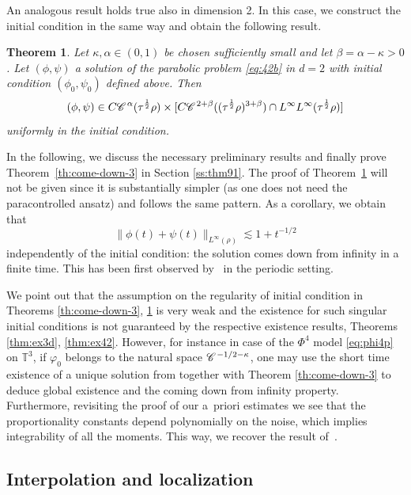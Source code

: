 \documentclass[a4paper,11pt]{article}
\newtheorem{theorem}{Theorem}[section]
\numberwithin{equation}{section}
\newcommand{\CC}{\mathscr{C} \hspace{.1em}}
\newcommand{\8}{\infty}
\begin{document}
An analogous result holds true also in dimension 2. In this case, we construct the initial condition in the same way and obtain the following result.


\begin{theorem}
  \label{th:come-down-2}
  Let $\kappa, \alpha\in (0,1)$ be chosen sufficiently small and let $\beta=\alpha-\kappa>0$. Let $(\phi, \psi)$ a solution of the parabolic problem \eqref{eq:42b}
  in $d = 2$ with initial condition $(\phi_{0},\psi_{0})$ defined above. Then
  \[ (\phi, \psi) \in C \CC^{\alpha} (\tau^{\frac 12} \rho) \times [C \CC^{2
     + \beta} ((\tau^{ \frac 12} \rho)^{3 + \beta}) \cap L^{\infty}
     L^{\infty} (\tau^{\frac 12} \rho)] \]
  uniformly in the initial condition.
\end{theorem}


In the following, we discuss the necessary preliminary results and finally prove Theorem~\ref{th:come-down-3} in Section \ref{ss:thm91}. The proof of
Theorem~\ref{th:come-down-2} will not be given since it is substantially simpler
(as one does not need the paracontrolled ansatz) and follows the same pattern.
As a corollary,  we obtain that
\[ \| \phi (t) + \psi (t) \|_{L^{\infty}(\rho)} \lesssim 1 + t^{- 1 / 2} \]
independently of the initial condition: the solution comes down from infinity in a
finite time. This has been first observed by~\cite{MWcomedown} in the periodic setting.




\begin{remark}
We point out that the assumption on the regularity of initial condition in Theorems \ref{th:come-down-3}, \ref{th:come-down-2} is very weak and the existence for such singular initial conditions is not guaranteed  by the respective existence results, Theorems \ref{thm:ex3d}, \ref{thm:ex42}. However, for instance in case of the $\Phi^{4}$ model  \eqref{eq:phi4p} on $\mathbb{T}^{3}$, if $\varphi_{0}$ belongs to the natural space $\CC^{-1/2-\kappa}$, one may use the short time existence of a unique solution from \cite{CC} together with Theorem \ref{th:come-down-3} to deduce global existence and the coming down from infinity property. Furthermore, revisiting the proof of our a~priori estimates we see that the proportionality constants depend polynomially on the noise, which implies integrability of all the moments. This way, we recover the result of~\cite{MWcomedown}.
\end{remark}



\subsection{Interpolation and localization}
\label{ss:d0}
\end{document}
